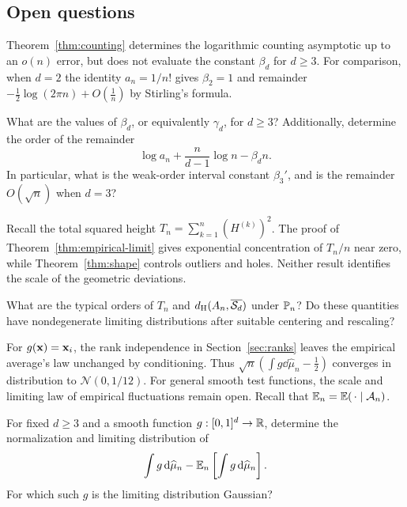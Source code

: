 \documentclass[11pt,letterpaper]{article}
\begin{document}
\subsection{Open questions}

Theorem~\ref{thm:counting} determines the logarithmic counting asymptotic up to an $o(n)$ error, but does not evaluate the constant $\beta_d$ for $d\ge3$. For comparison, when $d=2$ the identity $a_n=1/n!$ gives $\beta_2=1$ and remainder $-\frac12\log(2\pi n)+O(\frac1n)$ by Stirling's formula.

\begin{question}\label{ques:constant}
            What are the values of $\beta_d$, or equivalently $\gamma_d$, for $d\ge3$? Additionally, determine the order of the remainder
            \[
                  \log a_n+\frac{n}{d-1}\log n-\beta_dn.
            \]
            In particular, what is the weak-order interval constant $\beta_3'$, and is the remainder $O(\sqrt n)$ when $d=3$?
      \end{question}

Recall the total squared height $T_n=\sum_{k=1}^n(H^{(k)})^2$. The proof of Theorem~\ref{thm:empirical-limit} gives exponential concentration of $T_n/n$ near zero, while Theorem~\ref{thm:shape} controls outliers and holes. Neither result identifies the scale of the geometric deviations.

\begin{question}
      What are the typical orders of $T_n$ and $d_{\rm H}(A_n,\overline{\cS_d})$ under $\P_n$? Do these quantities have nondegenerate limiting distributions after suitable centering and rescaling?
\end{question}

For $g(\vx)=\vx_i$, the rank independence in Section~\ref{sec:ranks} leaves the empirical average's law unchanged by conditioning. Thus $\sqrt n(\int g\dd\widehat\mu_n-\frac12)$ converges in distribution to $\mathcal N(0,1/12)$. For general smooth test functions, the scale and limiting law of empirical fluctuations remain open. Recall that $\E_n=\E(\,\cdot\mid\cA_n)$.

\begin{question}
      For fixed $d\ge3$ and a smooth function $g:[0,1]^d\to\R$, determine the normalization and limiting distribution of
      \[
            \int g\dd\widehat\mu_n
            -\E_n\left[\int g\dd\widehat\mu_n\right].
      \]
      For which such $g$ is the limiting distribution Gaussian? %
\end{question}
\end{document}
